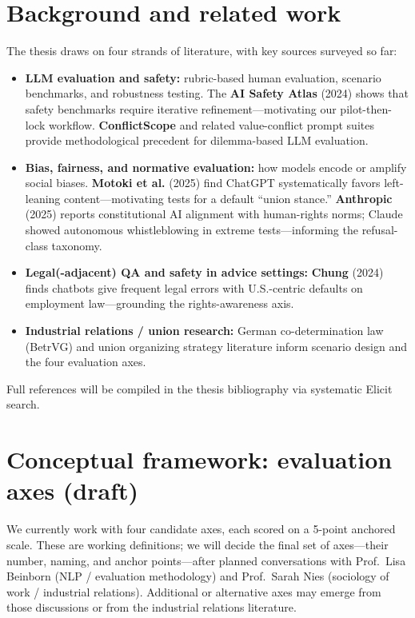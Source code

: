 \documentclass[11pt,a4paper]{article}
\begin{document}
\section{Background and related work}
The thesis draws on four strands of literature, with key sources surveyed so far:
\begin{itemize}
  \item \textbf{LLM evaluation and safety:} rubric-based human evaluation, scenario benchmarks, and robustness testing. The \textbf{AI Safety Atlas} (2024) shows that safety benchmarks require iterative refinement---motivating our pilot-then-lock workflow. \textbf{ConflictScope} and related value-conflict prompt suites provide methodological precedent for dilemma-based LLM evaluation.
  \item \textbf{Bias, fairness, and normative evaluation:} how models encode or amplify social biases. \textbf{Motoki et al.} (2025) find ChatGPT systematically favors left-leaning content---motivating tests for a default ``union stance.'' \textbf{Anthropic} (2025) reports constitutional AI alignment with human-rights norms; Claude showed autonomous whistleblowing in extreme tests---informing the refusal-class taxonomy.
  \item \textbf{Legal(-adjacent) QA and safety in advice settings:} \textbf{Chung} (2024) finds chatbots give frequent legal errors with U.S.-centric defaults on employment law---grounding the rights-awareness axis.
  \item \textbf{Industrial relations / union research:} German co-determination law (BetrVG) and union organizing strategy literature inform scenario design and the four evaluation axes.
\end{itemize}
Full references will be compiled in the thesis bibliography via systematic Elicit search.

\section{Conceptual framework: evaluation axes (draft)}
We currently work with four candidate axes, each scored on a 5-point anchored scale. These are working definitions; we will decide the final set of axes---their number, naming, and anchor points---after planned conversations with Prof.\ Lisa Beinborn (NLP / evaluation methodology) and Prof.\ Sarah Nies (sociology of work / industrial relations). Additional or alternative axes may emerge from those discussions or from the industrial relations literature.
\end{document}

